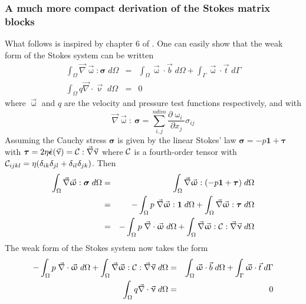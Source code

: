 \subsubsection{A much more compact derivation of the Stokes matrix blocks \label{sss:KGGT}}

What follows is inspired by chapter 6 of \textcite{dohu03}.
One can easily show that the weak form of the Stokes system can be written 
\begin{eqnarray}
\int_\Omega \vec\nabla \vec{\upomega} : {\bm \sigma} \; d\Omega
&=& \int_\Omega \vec\upomega \cdot \vec{b} \; d\Omega + \int_\Gamma \vec\upomega \cdot \vec{t} \; d\Gamma \\
\int_\Omega q \vec\nabla \cdot \vec{\upnu} \; d\Omega &=& 0
\end{eqnarray}
where $\vec\upomega$ and $q$ are the velocity and pressure test functions respectively, 
and with 
\[
\vec\nabla \vec{\upomega} :\ {\bm \sigma} 
= \sum_{i,j}^{ndim} \frac{\partial \upomega _i}{\partial x_j} \sigma_{ij}
\]
Assuming the Cauchy stress ${\bm \sigma}$ is given by the linear Stokes' law
${\bm \sigma} = -p {\bm 1} + {\bm \tau}$ with 
${\bm \tau} = 2\eta \dot{\bm \epsilon}(\vec\upnu) = {\cal C}: \vec\nabla\vec\upnu$
where ${\cal C}$ is a fourth-order tensor with 
${\cal C}_{ijkl} = \eta (\delta_{ik} \delta_{jl}+ \delta_{il}\delta_{jk})$. 
Then 
\begin{eqnarray}
\int_\Omega \vec\nabla \vec{\upomega} : {\bm \sigma} \; d\Omega
&=& \int_\Omega \vec\nabla \vec{\upomega} : ( -p {\bm 1} + {\bm \tau}) \; d\Omega \nonumber\\
&=& - \int_\Omega p \; \vec\nabla  \vec{\upomega} : {\bm 1}  \; d\Omega 
+ \int_\Omega \vec\nabla \vec{\upomega} : {\bm \tau} \; d\Omega \nonumber\\
&=& - \int_\Omega p \; \vec\nabla\cdot  \vec{\upomega}   \; d\Omega 
+ \int_\Omega \vec\nabla \vec{\upomega} : {\cal C} : \vec\nabla \vec\upnu\; d\Omega 
\end{eqnarray}
The weak form of the Stokes system now takes the form
\begin{eqnarray}
- \int_\Omega p \; \vec\nabla\cdot  \vec{\upomega}   \; d\Omega 
+ \int_\Omega \vec\nabla \vec{\upomega} : {\cal C} : \vec\nabla \vec\upnu\; d\Omega 
&=& \int_\Omega \vec\upomega \cdot \vec{b} \; d\Omega + \int_\Gamma \vec\upomega \cdot \vec{t} \; d\Gamma \\
\int_\Omega q \vec\nabla \cdot \vec{\upnu} \; d\Omega &=& 0
\end{eqnarray}
